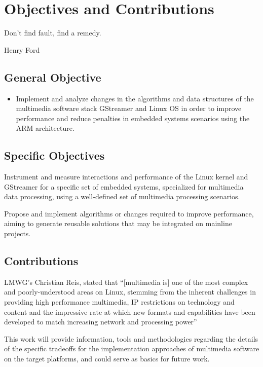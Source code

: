 \chapter{Objectives and Contributions}
\epigraph{Don't find fault, find a remedy.}{Henry Ford}

\section{General Objective}

\begin{itemize}
\item Implement and analyze changes in the algorithms and data structures of the multimedia software stack GStreamer and Linux \acl{OS} in order to improve performance and reduce penalties in embedded systems scenarios using the \ac{ARM} architecture.
\end{itemize}

\section{Specific Objectives}
\begin{itemize*}
\item Instrument and measure interactions and performance of the Linux kernel and GStreamer for a specific set of embedded systems, specialized for multimedia data processing, using a well-defined set of multimedia processing scenarios.
\item Propose and implement algorithms or changes required to improve performance, aiming to generate reusable solutions that may be integrated on mainline projects.
\end{itemize*}

\section{Contributions}
\ac{LMWG}'s Christian Reis, stated that ``[multimedia is] one of the most complex and poorly-understood areas on Linux, stemming from the inherent challenges in providing high performance multimedia, IP restrictions on technology and content and the impressive rate at which new formats and capabilities have been developed to match increasing network and processing power'' \cite{Reis:vn}

This work will provide information, tools and methodologies regarding the details of the specific tradeoffs for the implementation approaches of multimedia software on the target platforms, and could serve as basics for future work.

